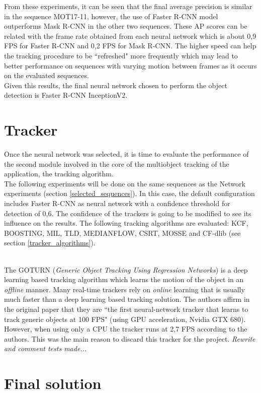 From these experiments, it can be seen that the final average precision is similar in the sequence MOT17-11, however, the use of Faster R-CNN model outperforms Mask R-CNN in the other two sequences. These AP scores can be related with the frame rate obtained from each neural network which is about 0,9 FPS for Faster R-CNN and 0,2 FPS for Mask R-CNN. The higher speed can help the tracking procedure to be ``refreshed" more frequently which may lead to better performance on sequences with varying motion between frames as it occurs on the evaluated sequences.\\
Given this results, the final neural network chosen to perform the object detection is Faster R-CNN InceptionV2.
\section{Tracker}
Once the neural network was selected, it is time to evaluate the performance of the second module involved in the core of the multiobject tracking of the application, the tracking algorithm.\\
The following experiments will be done on the same sequences as the Network experiments (section \ref{selected_sequences}). In this case, the default configuration includes Faster R-CNN as neural network with a confidence threshold for detection of 0,6. The confidence of the trackers is going to be modified to see its influence on the results. The following tracking algorithms are evaluated: KCF, BOOSTING, MIL, TLD, MEDIANFLOW, CSRT, MOSSE and CF-dlib (see section \ref{tracker_algorithms}).

\\
The GOTURN (\textit{Generic Object Tracking Using Regression Networks}) is a deep learning based tracking algorithm which learns the motion of the object in an \textit{offline} manner. Many real-time trackers rely on \textit{online} learning that is usually much faster than a deep learning based tracking solution. The authors affirm in the original paper \cite{held2016learning} that they are ``the first neural-network tracker that learns to track generic objects at 100 FPS" (using GPU acceleration, Nvidia GTX 680). However, when using only a CPU the tracker runs at 2,7 FPS according to the authors. This was the main reason to discard this tracker for the project. \textit{Rewrite and comment tests made...} %
\section{Final solution}
